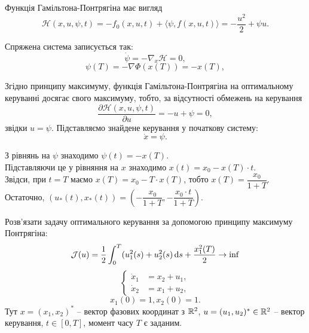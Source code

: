 \begin{solution}
    Функція Гамільтона-Понтрягіна має вигляд
    \begin{equation}
        \mathcal{H} (x, u, \psi, t) = - f_0(x, u, t) + \langle \psi, f(x, u, t) \rangle = - \dfrac{u^2}{2} + \psi u.
    \end{equation}
    
    Спряжена система записується так:
    \begin{equation} 
        \dot \psi = - \nabla_x \mathcal{H} = 0,
    \end{equation}
    \begin{equation} 
        \psi(T) = - \nabla \Phi(x(T)) = - x(T),
    \end{equation}
    
    Згідно принципу максимуму, функція Гамільтона-Понтрягіна на оптимальному керуванні досягає свого максимуму, тобто, за відсутності обмежень на керування
    \begin{equation} 
        \dfrac{\partial \mathcal{H}(x, u, \psi, t)}{\partial u} = - u + \psi = 0,
    \end{equation}
    звідки $u = \psi$. Підставляємо знайдене керування у початкову систему:
    \begin{equation}
        \dot x = \psi.
    \end{equation}
    
    З рівнянь на $\psi$ знаходимо $\psi(t) = - x(T)$. \\
    
    Підставляючи це у рівняння на $x$ знаходимо $x(t) = x_0 - x(T) \cdot t$. \\
    
    Звідси, при $t = T$ маємо $x(T) = x_0 - T \cdot x(T)$, тобто $x(T) = \dfrac{x_0}{1 + T}$. \\
    
    Остаточно, $(u_*(t), x_*(t)) = \left(- \dfrac{x_0}{1 + T}, - \dfrac{x_0 \cdot t}{1 + T}\right)$.
    
\end{solution}

\begin{problem}
    Розв'язати задачу оптимального керування за допомогою принципу максимуму Понтрягіна:
    \begin{equation*}
        \mathcal{J}(u) = \dfrac 12 \int_0^T (u_1^2(s) + u_2^2(s) \mathop{}\!\mathrm{d} s + \dfrac{x_1^2(T)}{2} \to \inf
    \end{equation*}
    \[ \left\{ \begin{aligned}
        \dot x_1 &= x_2 + u_1, \\
        \dot x_2 &= x_1 + u_2,
    \end{aligned} \right. \]
    \begin{equation*}
        x_1(0) = 1, x_2(0) = 1.
    \end{equation*}
    Тут $x = (x_1, x_2)^*$ -- вектор фазових координат з $\mathbb{R}^2$, $u = (u_1, u_2)^* \in \mathbb{R}^2$ -- вектор керування, $t \in [0, T]$, момент часу $T$ є заданим.
\end{problem}


